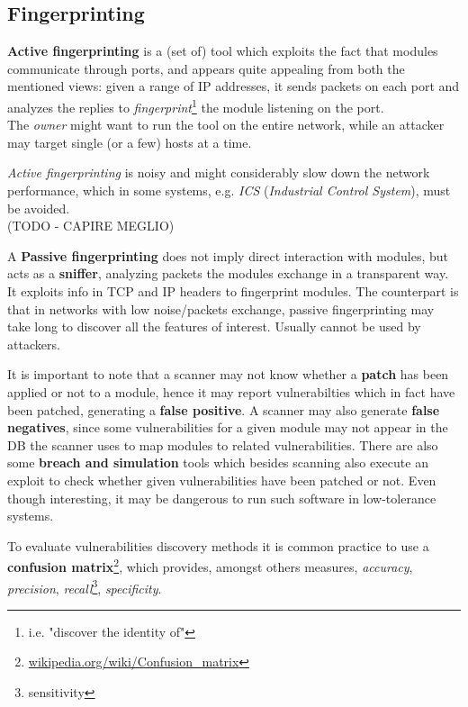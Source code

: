 \subsection{Fingerprinting}

\textbf{Active fingerprinting} is a (set of) tool which exploits the fact that modules communicate through ports, and appears quite appealing from both the mentioned views:
given a range of IP addresses, it sends packets on each port and analyzes the replies to \textit{fingerprint}\footnote{i.e. "discover the identity of"} the module listening on the port.\\
The \textit{owner} might want to run the tool on the entire network, while an attacker may target single (or a few) hosts at a time.


\textit{Active fingerprinting} is noisy and might considerably slow down the network performance, which in some systems, e.g. \textit{ICS} (\textit{Industrial Control System}), must be avoided.\\
(TODO - CAPIRE MEGLIO)\nl

A \textbf{Passive fingerprinting} does not imply direct interaction with modules, but acts as a \textbf{sniffer}, analyzing packets the modules exchange in a transparent way.
It exploits info in TCP and IP headers to fingerprint modules.
The counterpart is that in networks with low noise/packets exchange, passive fingerprinting may take long to discover all the features of interest.
Usually cannot be used by attackers.\nl

It is important to note that a scanner may not know whether a \textbf{patch} has been applied or not to a module,
hence it may report vulnerabilties which in fact have been patched, generating a \textbf{false positive}.
A scanner may also generate \textbf{false negatives}, since some vulnerabilities for a given module may not appear in the DB the scanner uses to map modules to related vulnerabilities.
There are also some \textbf{breach and simulation} tools which besides scanning also execute an exploit to check whether given vulnerabilities have been patched or not.
Even though interesting, it may be dangerous to run such software in low-tolerance systems.


To evaluate vulnerabilities discovery methods it is common practice to use a \textbf{confusion matrix}\footnote{\href{https://en.wikipedia.org/wiki/Confusion_matrix}{wikipedia.org/wiki/Confusion\_matrix}},
which provides, amongst others measures, \textit{accuracy}, \textit{precision}, \textit{recall}\footnote{sensitivity}, \textit{specificity}.\nl

